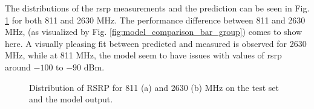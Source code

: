 The distributions of the \gls{rsrp} measurements and the prediction can be seen in Fig. \ref{fig:dist_pred_target} for both 811 and 2630 MHz. The performance difference between 811 and 2630 MHz, (as visualized by Fig. \ref{fig:model_comparison_bar_group}) comes to show here. A visually pleasing fit between predicted and measured is observed for 2630 MHz, while at 811 MHz, the model seem to have issues with values of \gls{rsrp} around $-100$ to $-90$ dBm.

\begin{figure}
    \centering
    \caption{Distribution of RSRP for 811 (a) and 2630 (b) MHz on the test set and the model output.}
    \label{fig:dist_pred_target}
\end{figure}

